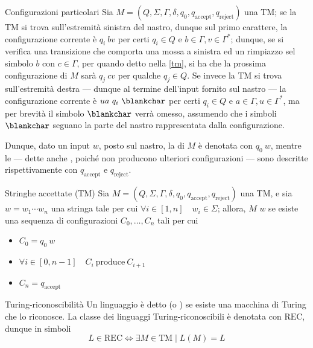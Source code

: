 \documentclass[a4paper, 12pt]{report}
\begin{document}
    \begin{framedobs}{Configurazioni particolari}
        Sia $M = (Q, \Sigma, \Gamma, \delta, q_0, q_\mathrm{accept}, q_\mathrm{reject})$ una TM; se la TM si trova sull'estremità sinistra del nastro, dunque sul primo carattere, la configurazione corrente è $q_i \ bv$ per certi $q_i \in Q$ e $b \in \Gamma, v \in \Gamma^*$; dunque, se si verifica una transizione che comporta una mossa a sinistra ed un rimpiazzo sel simbolo $b$ con $c \in \Gamma$, per quando detto nella \cref{tm}, si ha che la prossima configurazione di $M$ sarà $q_j \ cv$ per qualche $q_j \in Q$. Se invece la TM si trova sull'estremità destra --- dunque al termine dell'input fornito sul nastro --- la configurazione corrente è $ua \ q_i \ \blankchar$ per certi $q_i \in Q$ e $a \in \Gamma, u \in \Gamma^*$, ma per brevità il simbolo $\blankchar$ verrà omesso, assumendo che i simboli $\blankchar$ seguano la parte del nastro rappresentata dalla configurazione.

        Dunque, dato un input $w$, posto sul nastro, la  di $M$ è denotata con $q_0 \ w$, mentre le  --- dette anche , poiché non producono ulteriori configurazioni --- sono descritte rispettivamente con $q_\mathrm{accept}$ e $q_\mathrm{reject}$.
    \end{framedobs}

    \begin{frameddefn}{Stringhe accettate (TM)}
        Sia $M = (Q, \Sigma, \Gamma, \delta, q_0, q_\mathrm{accept}, q_\mathrm{reject})$ una TM, e sia $w = w_1 \cdots w_n$ una stringa tale per cui $\forall i \in [1, n] \quad w_i \in \Sigma$; allora, $M$  $w$ se esiste una sequenza di configurazioni $C_0, \ldots, C_n$ tali per cui

        \begin{itemize}
            \item $C_0 = q_0 \ w$
            \item $\forall i \in [0, n - 1] \quad C_i \ \mathrm{produce} \ C_{i + 1}$
            \item $C_n = q_\mathrm{accept}$
        \end{itemize}
    \end{frameddefn}

    \begin{frameddefn}{Turing-riconoscibilità}
        Un linguaggio è detto  (o ) se esiste una macchina di Turing che lo riconosce. La classe dei linguaggi Turing-riconoscibili è denotata con $\mathrm{REC}$, dunque in simboli $$L \in \mathrm{REC} \iff \exists M \in \mathrm{TM} \mid L(M) = L$$
    \end{frameddefn}
\end{document}
